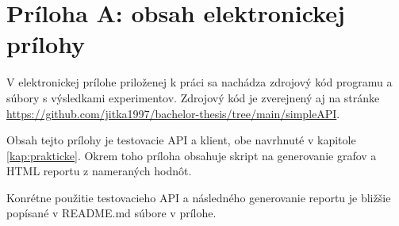 \chapter*{Príloha A: obsah elektronickej prílohy}

V elektronickej prílohe priloženej k práci sa nachádza zdrojový kód
programu a súbory s výsledkami experimentov. Zdrojový kód je
zverejnený aj na stránke \url{https://github.com/jitka1997/bachelor-thesis/tree/main/simpleAPI}.

Obsah tejto prílohy je testovacie API a klient, obe navrhnuté v kapitole \ref{kap:prakticke}. Okrem toho príloha obsahuje skript na generovanie grafov a HTML reportu z nameraných hodnôt.

Konrétne použitie testovacieho API a následného generovanie reportu je bližšie popísané v README.md súbore v prílohe.
